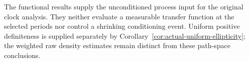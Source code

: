 The functional results supply the unconditioned process input for the
original clock analysis. They neither evaluate a measurable transfer
function at the selected periods nor control a shrinking conditioning
event. Uniform positive definiteness is supplied separately by
Corollary~\ref{cor:actual-uniform-ellipticity}; the weighted raw density
estimates remain distinct from these path-space conclusions.
